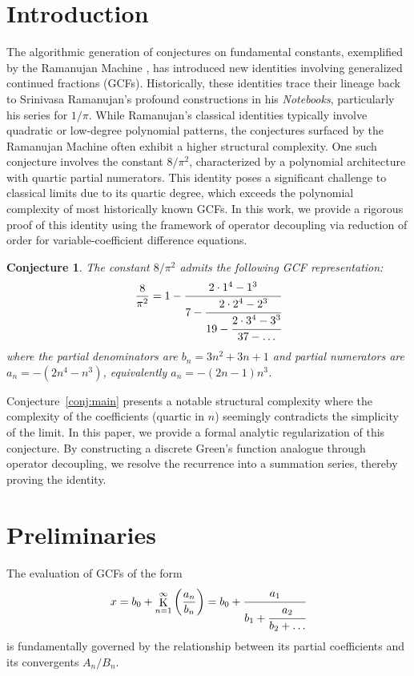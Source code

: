 \documentclass[pdflatex,sn-mathphys-num]{sn-jnl}
\DeclareMathOperator*{\K}{K}
\theoremstyle{thmstyleone}
\newtheorem{conjecture}[theorem]{Conjecture}
\theoremstyle{thmstyletwo}
\theoremstyle{thmstylethree}
\begin{document}
	\section{Introduction}
	The algorithmic generation of conjectures on fundamental constants, exemplified by the Ramanujan Machine \cite{Raayoni2021}, has introduced new identities involving generalized continued fractions (GCFs).
	Historically, these identities trace their lineage back to Srinivasa Ramanujan's profound constructions in his \textit{Notebooks}, particularly his series for $1/\pi$. While Ramanujan's classical identities typically involve quadratic or low-degree polynomial patterns, the conjectures surfaced by the Ramanujan Machine often exhibit a higher structural complexity. One such conjecture involves the constant $8/\pi^2$, characterized by a polynomial architecture with quartic partial numerators.
	This identity poses a significant challenge to classical limits due to its quartic degree, which exceeds the polynomial complexity of most historically known GCFs.
	In this work, we provide a rigorous proof of this identity using the framework of operator decoupling via reduction of order for variable-coefficient difference equations.
	
	\begin{conjecture}\label{conj:main}
		The constant $8/\pi^2$ admits the following GCF representation:
		\begin{equation}\label{eq:conjecture}
			\frac{8}{\pi^2} = 1 - \cfrac{2 \cdot 1^4 - 1^3}{7 - \cfrac{2 \cdot 2^4 - 2^3}{19 - \cfrac{2 \cdot 3^4 - 3^3}{37 - \dots}}}
		\end{equation}
		where the partial denominators are $b_n = 3n^2+3n+1$ and partial numerators are $a_n = -(2n^4-n^3)$, equivalently $a_n = -(2n-1)n^3$.
	\end{conjecture}
	
	Conjecture~\eqref{conj:main} presents a notable structural complexity where the complexity of the coefficients (quartic in $n$) seemingly contradicts the simplicity of the limit. In this paper, we provide a formal analytic regularization of this conjecture. By constructing a discrete Green's function analogue through operator decoupling, we resolve the recurrence into a summation series, thereby proving the identity.
	
	\section{Preliminaries}
	The evaluation of GCFs of the form
	\begin{equation}
		x = b_0 + \K_{n=1}^{\infty} \left( \frac{a_n}{b_n} \right) = b_0 + \cfrac{a_1}{b_1 + \cfrac{a_2}{b_2 + \dots}}
	\end{equation}
	is fundamentally governed by the relationship between its partial coefficients and its convergents $A_n/B_n$.
	
\end{document}
